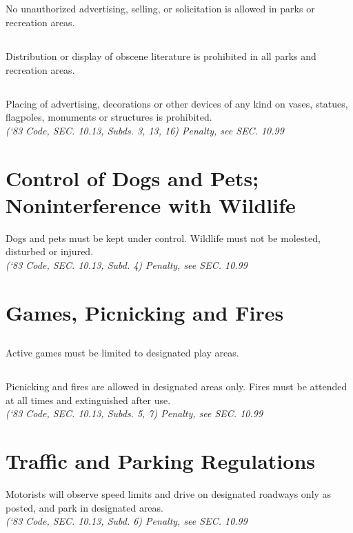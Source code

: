 \subsection{}
No unauthorized advertising, selling, or solicitation is allowed in parks or recreation areas.
\subsection{}
Distribution or display of obscene literature is prohibited in all parks and recreation areas.
\subsection{}
Placing of advertising, decorations or other devices of any kind on vases, statues, flagpoles, monuments or structures is prohibited.\\
\emph{(‘83 Code, SEC. 10.13, Subds. 3, 13, 16)  Penalty, see SEC. 10.99}
\section{Control of Dogs and Pets; Noninterference with Wildlife}
Dogs and pets must be kept under control.  Wildlife must not be molested, disturbed or injured.\\
\emph{(‘83 Code, SEC. 10.13, Subd. 4)  Penalty, see SEC. 10.99}
\section{Games, Picnicking and Fires}
\subsection{}
Active games must be limited to designated play areas.
\subsection{}
Picnicking and fires are allowed in designated areas only.  Fires must be attended at all times and extinguished after use.\\
\emph{(‘83 Code, SEC. 10.13, Subds. 5, 7)  Penalty, see SEC. 10.99}
\section{Traffic and Parking Regulations}
Motorists will observe speed limits and drive on designated roadways only as posted, and park in designated areas.\\
\emph{(‘83 Code, SEC. 10.13, Subd. 6)  Penalty, see SEC. 10.99}
